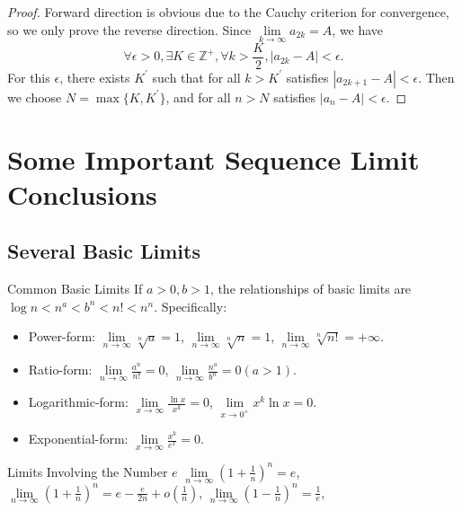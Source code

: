\begin{proof}
  Forward direction is obvious due to the Cauchy criterion for convergence,
  so we only prove the reverse direction.
  Since $\lim \limits _{k \rightarrow \infty} a_{2k} = A$, we have
  \begin{equation}
    \forall \epsilon > 0, \exists K \in \mathbb{Z}^+, \forall k > \frac{K}{2}, |a_{2k} - A| < \epsilon.
  \end{equation}
  For this $\epsilon$, there exists $K^{\prime}$ such that for all $k >
  K^{\prime}$ satisfies $|a_{2k + 1} - A| < \epsilon$.
  Then we choose $N = \max \{K, K^{\prime}\}$, and for all $n > N$ satisfies
  $|a_n - A| < \epsilon$.
\end{proof}

\section{Some Important Sequence Limit Conclusions}

\subsection{Several Basic Limits}

\begin{proposition}{Common Basic Limits}{}
  If $a > 0, b > 1$, the relationships of basic limits are
  $\log n < n^a < b^n < n! < n^n$. Specifically:
  \begin{itemize}
  \item Power-form: $\lim \limits _{n \rightarrow \infty} \sqrt[n]{a} = 1$,
    $\lim \limits _{n \rightarrow \infty} \sqrt[n]{n} = 1$,
    $\lim \limits _{n \rightarrow \infty} \sqrt[n]{n!} = +\infty$.
  \item Ratio-form: $\lim \limits _{n \rightarrow \infty} \frac{a^n}{n!} = 0$,
    $\lim \limits _{n \rightarrow \infty} \frac{n^a}{b^n} = 0 (a > 1)$.
  \item Logarithmic-form: $\lim \limits _{x \rightarrow \infty} \frac{\ln
      x}{x^k} = 0$,
    $\lim \limits _{x \rightarrow 0^+} x^k \ln x = 0$.
  \item Exponential-form: $\lim \limits _{x \rightarrow \infty} \frac{x^k}{e^x}
    = 0$.
  \end{itemize}
\end{proposition}

\begin{proposition}{Limits Involving the Number $e$}{}
  $\lim \limits _{n \rightarrow \infty} \left(1 + \frac{1}{n}\right)^n = e$,
  $\lim \limits _{n \rightarrow \infty} (1 + \frac{1}{n})^n = e - \frac{e}{2n} +
  o(\frac{1}{n})$,
  $\lim \limits _{n \rightarrow \infty} \left( 1 - \frac{1}{n} \right)^n = \frac{1}{e}$,
\end{proposition}

